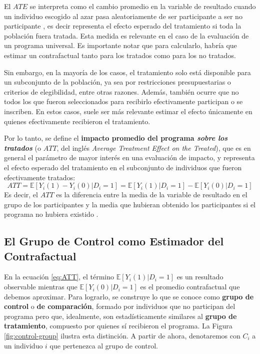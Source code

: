 \documentclass[../../main.tex]{subfiles}
\begin{document}
El \(ATE\) se interpreta como el cambio promedio en la variable de resultado cuando un
individuo escogido al azar pasa aleatoriamente de ser participante a ser no participante
\cite{bernal}, es decir representa el efecto esperado del tratamiento si toda la población
fuera tratada. Esta medida es relevante en el caso de la evaluación de un programa
universal. Es importante notar que para calcularlo, habría que estimar un contrafactual
tanto para los tratados como para los no tratados.

Sin embargo, en la mayoría de los casos, el tratamiento solo está disponible para un
subconjunto de la población, ya sea por restricciones presupuestarias o criterios de
elegibilidad, entre otras razones. Además, también ocurre que no todos los que fueron
seleccionados para recibirlo efectivamente participan o se inscriben. En estos casos,
suele ser más relevante estimar el efecto únicamente en quienes efectivamente recibieron
el tratamiento.

Por lo tanto, se define el \textbf{impacto promedio del programa \textit{sobre los
tratados}} (o \(ATT\), del inglés \textit{Average Treatment Effect on the Treated}), que
es en general el parámetro de mayor interés en una evaluación de impacto, y representa el
efecto esperado del tratamiento en el subconjunto de individuos que fueron efectivamente
tratados:
\begin{equation}
    ATT = \mathbb{E} \left[Y_i(1)-Y_i(0)|D_i=1\right] = \mathbb{E} \left[Y_i(1)|D_i=1\right] -
    \mathbb{E} \left[Y_i(0)|D_i=1\right]
    \label{eq:ATT}
\end{equation}
Es decir, el \(ATT\) es la diferencia entre la media de la variable de resultado en el
grupo de los participantes y la media que hubieran obtenido los participantes si el
programa no hubiera existido \cite{bernal}.

\subsection{El Grupo de Control como Estimador del Contrafactual}
En la ecuación \ref{eq:ATT}, el término \(\mathbb{E} \left[Y_i(1)|D_i=1\right]\) es un
resultado observable mientras que \(\mathbb{E} \left[Y_i(0)|D_i=1\right]\) es el promedio
contrafactual que debemos aproximar. Para lograrlo, se construye lo que se conoce como
\textbf{grupo de control} o \textbf{de comparación}, formado por individuos que no
participan del programa pero que, idealmente, son estadísticamente similares
\cite{gertler-2016} al \textbf{grupo de tratamiento}, compuesto por quienes sí recibieron
el programa. La Figura \ref{fig:control-group} ilustra esta distinción. A partir de ahora,
denotaremos con \(C_i\) a un individuo \(i\) que pertenezca al grupo de control.
\end{document}
